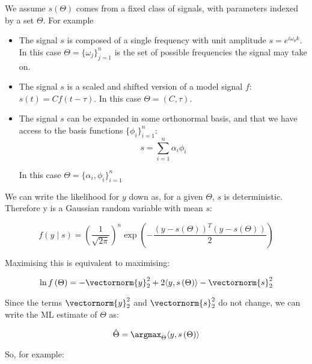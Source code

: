We assume \(s\left(\Theta\right)\) comes from a fixed class of signals, with parameters indexed by a set \(\Theta\). For example

\begin{itemize}
\item The signal \(s\) is composed of a single frequency with unit amplitude \(s = e^{i \omega_0 k}\). In this case \( \Theta = \{\omega_j\}_{j=1}^n \) is the set of possible frequencies the signal may take on.

\item The signal \(s\) is a scaled and shifted version of a model signal \(f\): \(s(t) = Cf\left(t - \tau\right)\). In this case \(\Theta = \left(C, \tau \right)\).

\item The signal \(s\) can be expanded in some orthonormal basis, and that we have access to the basis functions \(\{\phi_i\}_{i=1}^n\):
\begin{equation}
s = \sum_{i=1}^n \alpha_i \phi_i
\end{equation}

In this case \(\Theta = \{\alpha_i, \phi_i\}_{i=1}^n\)

\end{itemize}

We can write the likelihood for \(y\) down as, for a given \(\Theta\), \(s\) is deterministic. Therefore y is a Gaussian random variable with mean \(s\):

\begin{equation}
f\left(y \mid s\right) = \left(\frac{1}{\sqrt{2\pi}} \right)^n \exp{\left( - \frac{\left(y-s(\Theta)\right)^T\left(y-s(\Theta)\right)}{2} \right)}
\end{equation}

Maximising this is equivalent to maximising:

\begin{equation}
\ln f\left(\Theta\right) = -\vectornorm{y}_2^2 + 2\langle y, s\left(\Theta\right)\rangle - \vectornorm{s}_2^2
\end{equation}

Since the terms \(\vectornorm{y}_2^2\) and \(\vectornorm{s}_2^2\) do not change, we can write the ML estimate of \(\Theta\) as:

\begin{equation}
\hat{\Theta} = \argmax_{\Theta} \langle y, s\left(\Theta\right)\rangle
\end{equation}

So, for example:

